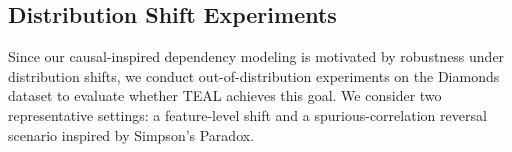 \documentclass[conference]{IEEEtran}
\newcommand{\icde}[1]{{\color{black}#1}}
\newcommand{\kdd}[1]{{\color{black}#1}}
\newcommand{\sydesi}[1]{{\color{black}#1}}
\newcommand{\syfix}[1]{{\color{black}#1}}
\newcommand{\syne}[1]{{\color{black}#1}}
\newcommand{\syic}[1]{{\color{black}#1}}
\newcommand*{\ourmodel}{TEAL}
\begin{document}


\subsection{Distribution Shift Experiments}

\sydesi{Since \syic{our causal-inspired dependency modeling} is motivated by robustness under distribution shifts}\kdd{,
we conduct out-of-distribution experiments on the Diamonds dataset to evaluate whether \ourmodel{} achieves this goal. We consider two representative settings: a feature-level shift and a spurious-correlation reversal scenario inspired by Simpson's Paradox\cite{r:peters2017}.}
\end{document}
